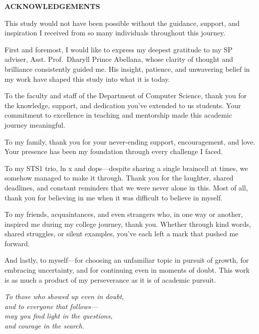 \documentclass[11pt]{article}
\begin{document}
\newpage

\begin{center}
\Large\textbf{ACKNOWLEDGEMENTS}
\end{center}

\vspace{1em} %

This study would not have been possible without the guidance, support, and inspiration I received from so many individuals throughout this journey.

First and foremost, I would like to express my deepest gratitude to my SP adviser, Asst. Prof.~Dharyll Prince Abellana, whose clarity of thought and brilliance consistently guided me. His insight, patience, and unwavering belief in my work have shaped this study into what it is today.

To the faculty and staff of the Department of Computer Science, thank you for the knowledge, support, and dedication you’ve extended to us students. Your commitment to excellence in teaching and mentorship made this academic journey meaningful.

To my family, thank you for your never-ending support, encouragement, and love. Your presence has been my foundation through every challenge I faced.

To my STS1 trio, ln x and dops—despite sharing a single braincell at times, we somehow managed to make it through. Thank you for the laughter, shared deadlines, and constant reminders that we were never alone in this. Most of all, thank you for believing in me when it was difficult to believe in myself.

To my friends, acquaintances, and even strangers who, in one way or another, inspired me during my college journey, thank you. Whether through kind words, shared struggles, or silent examples, you’ve each left a mark that pushed me forward.

And lastly, to myself—for choosing an unfamiliar topic in pursuit of growth, for embracing uncertainty, and for continuing even in moments of doubt. This work is as much a product of my perseverance as it is of academic pursuit.


\newpage


\null\vfill
\begin{center}
\large\textit{To those who showed up even in doubt,\\
and to everyone that follows—\\
may you find light in the questions,\\
and courage in the search.}
\end{center}
\vfill
\end{document}
